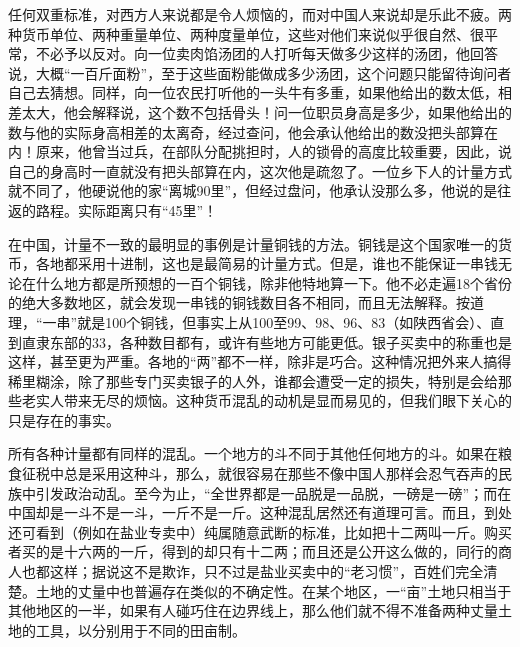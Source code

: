 \documentclass[12pt,oneside]{book}
\begin{document}
\begin{common-format}
任何双重标准，对西方人来说都是令人烦恼的，而对中国人来说却是乐此不疲。两种货币单位、两种重量单位、两种度量单位，这些对他们来说似乎很自然、很平常，不必予以反对。向一位卖肉馅汤团的人打听每天做多少这样的汤团，他回答说，大概“一百斤面粉”，至于这些面粉能做成多少汤团，这个问题只能留待询问者自己去猜想。同样，向一位农民打听他的一头牛有多重，如果他给出的数太低，相差太大，他会解释说，这个数不包括骨头！问一位职员身高是多少，如果他给出的数与他的实际身高相差的太离奇，经过查问，他会承认他给出的数没把头部算在内！原来，他曾当过兵，在部队分配挑担时，人的锁骨的高度比较重要，因此，说自己的身高时一直就没有把头部算在内，这次他是疏忽了。一位乡下人的计量方式就不同了，他硬说他的家“离城90里”，但经过盘问，他承认没那么多，他说的是往返的路程。实际距离只有“45里”！ 

在中国，计量不一致的最明显的事例是计量铜钱的方法。铜钱是这个国家唯一的货币，各地都采用十进制，这也是最简易的计量方式。但是，谁也不能保证一串钱无论在什么地方都是所预想的一百个铜钱，除非他特地算一下。他不必走遍18个省份的绝大多数地区，就会发现一串钱的铜钱数目各不相同，而且无法解释。按道理，“一串”就是100个铜钱，但事实上从100至99、98、96、83（如陕西省会）、直到直隶东部的33，各种数目都有，或许有些地方可能更低。银子买卖中的称重也是这样，甚至更为严重。各地的“两”都不一样，除非是巧合。这种情况把外来人搞得稀里糊涂，除了那些专门买卖银子的人外，谁都会遭受一定的损失，特别是会给那些老实人带来无尽的烦恼。这种货币混乱的动机是显而易见的，但我们眼下关心的只是存在的事实。 

所有各种计量都有同样的混乱。一个地方的斗不同于其他任何地方的斗。如果在粮食征税中总是采用这种斗，那么，就很容易在那些不像中国人那样会忍气吞声的民族中引发政治动乱。至今为止，“全世界都是一品脱是一品脱，一磅是一磅”；而在中国却是一斗不是一斗，一斤不是一斤。这种混乱居然还有道理可言。而且，到处还可看到（例如在盐业专卖中）纯属随意武断的标准，比如把十二两叫一斤。购买者买的是十六两的一斤，得到的却只有十二两；而且还是公开这么做的，同行的商人也都这样；据说这不是欺诈，只不过是盐业买卖中的“老习惯”，百姓们完全清楚。土地的丈量中也普遍存在类似的不确定性。在某个地区，一“亩”土地只相当于其他地区的一半，如果有人碰巧住在边界线上，那么他们就不得不准备两种丈量土地的工具，以分别用于不同的田亩制。 


\end{common-format}
\end{document}

